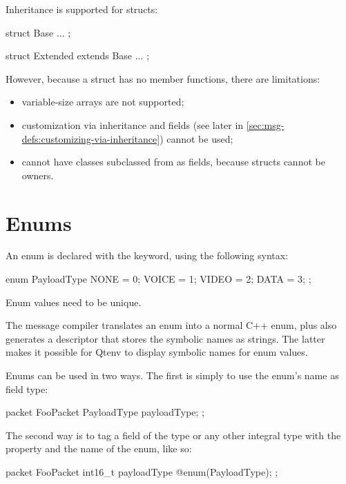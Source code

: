 Inheritance is supported for structs:

\begin{msg}
struct Base
{
    ...
};

struct Extended extends Base
{
    ...
};
\end{msg}

However, because a struct has no member functions, there are limitations:

\begin{itemize}
   \item variable-size arrays are not supported;
   \item customization via inheritance and  fields
      (see later in \ref{sec:msg-defs:customizing-via-inheritance})
      cannot be used;
   \item cannot have classes subclassed from  as fields,
      because structs cannot be owners.
\end{itemize}


\section{Enums}
\label{sec:msg-defs:enums}

An enum is declared with the  keyword, using the following
syntax:

\begin{msg}
enum PayloadType
{
   NONE = 0;
   VOICE = 1;
   VIDEO = 2;
   DATA = 3;
};
\end{msg}

Enum values need to be unique.

The message compiler translates an enum into a normal C++ enum, plus also
generates a descriptor that stores the symbolic names as strings. The latter
makes it possible for Qtenv to display symbolic names for enum values.

Enums can be used in two ways. The first is simply to use the enum's name as
field type:

\begin{msg}
packet FooPacket
{
    PayloadType payloadType;
};
\end{msg}

The second way is to tag a field of the type  or any
other integral type with the  property and the name of
the enum, like so:

\begin{msg}
packet FooPacket
{
    int16_t payloadType @enum(PayloadType);
};
\end{msg}

